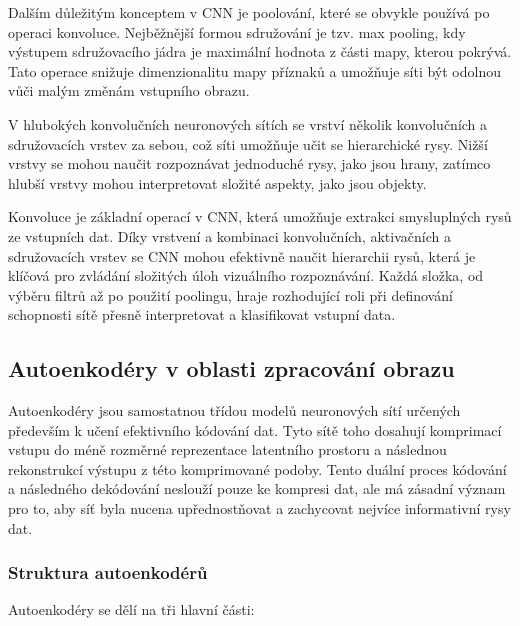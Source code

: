 \documentclass[male,czech,api_ing]{thesis}
\begin{document}
Dalším důležitým konceptem v CNN je poolování, které se obvykle používá po operaci konvoluce. Nejběžnější formou sdružování je tzv. max pooling, kdy výstupem sdružovacího jádra je maximální hodnota z části mapy, kterou pokrývá. Tato operace snižuje dimenzionalitu mapy příznaků a umožňuje síti být odolnou vůči malým změnám vstupního obrazu.

V hlubokých konvolučních neuronových sítích se vrství několik konvolučních a sdružovacích vrstev za sebou, což síti umožňuje učit se hierarchické rysy. Nižší vrstvy se mohou naučit rozpoznávat jednoduché rysy, jako jsou hrany, zatímco hlubší vrstvy mohou interpretovat složité aspekty, jako jsou objekty.

Konvoluce je základní operací v CNN, která umožňuje extrakci smysluplných rysů ze vstupních dat. Díky vrstvení a kombinaci konvolučních, aktivačních a sdružovacích vrstev se CNN mohou efektivně naučit hierarchii rysů, která je klíčová pro zvládání složitých úloh vizuálního rozpoznávání. Každá složka, od výběru filtrů až po použití poolingu, hraje rozhodující roli při definování schopnosti sítě přesně interpretovat a klasifikovat vstupní data. \cite{CNNConcepts, CNNConcepts2}

\subsection{Autoenkodéry v oblasti zpracování obrazu}
Autoenkodéry jsou samostatnou třídou modelů neuronových sítí určených především k učení efektivního kódování dat. Tyto sítě toho dosahují komprimací vstupu do méně rozměrné reprezentace latentního prostoru a následnou rekonstrukcí výstupu z této komprimované podoby. Tento duální proces kódování a následného dekódování neslouží pouze ke kompresi dat, ale má zásadní význam pro to, aby síť byla nucena upřednostňovat a zachycovat nejvíce informativní rysy dat.

\subsubsection{Struktura autoenkodérů}
Autoenkodéry se dělí na tři hlavní části:
\end{document}
